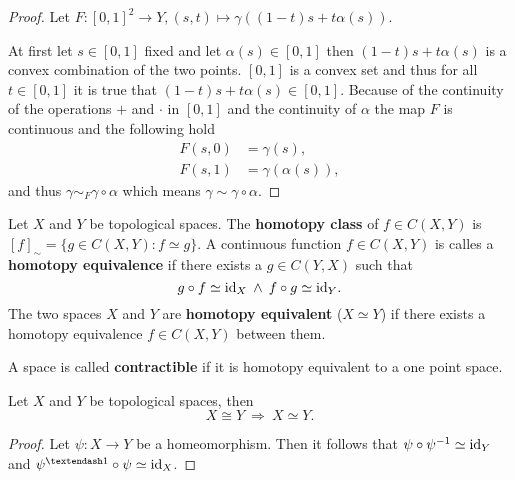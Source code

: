 \begin{proof}
  Let $F\colon [0,1]^2 \to Y, (s, t) \mapsto \gamma((1 - t)s + t\alpha(s))$.

  At first let $s \in [0,1]$ fixed and let $\alpha(s) \in [0,1]$ then $(1 - t)s + t\alpha(s)$ is a convex combination of the two points. 
  $[0,1]$ is a convex set and thus for all $t\in[0,1]$ it is true that $(1 - t)s + t\alpha(s) \in [0,1]$. Because of the continuity of the operations $+$ and $\cdot$ in $[0,1]$ 
  and the continuity of $\alpha$ the map $F$ is continuous and the following hold
  \begin{align*}
    F(s, 0) &= \gamma(s), \\
    F(s, 1) &= \gamma(\alpha(s)),
  \end{align*}
  and thus $\gamma \sim_F \gamma \circ \alpha$ which means $\gamma \sim \gamma \circ \alpha$.
\end{proof}

\begin{defin}
  Let $X$ and $Y$ be topological spaces. The \textbf{homotopy class} of $f \in C(X, Y)$ is $[f]_{\sim} = \{g \in C(X, Y)\colon f \simeq g\}$. A continuous function $f \in C(X, Y)$ is calles a \textbf{homotopy equivalence} if there exists a $g \in C(Y, X)$ such that
  \begin{equation*}
    g \circ f \simeq {\rm id}_X \: \land \: f \circ g \simeq {\rm id}_Y.
  \end{equation*}
  The two spaces $X$ and $Y$ are \textbf{homotopy equivalent} ($X \simeq Y$) if there exists a homotopy equivalence $f \in C(X, Y)$ between them.

  A space is called \textbf{contractible} if it is homotopy equivalent to a one point space.
\end{defin}

\begin{lemma}
  Let $X$ and $Y$ be topological spaces, then
  \begin{equation*}
    X \cong Y \: \Rightarrow \: X \simeq Y.
  \end{equation*}
\end{lemma}

\begin{proof}
  Let $\psi\colon X \to Y$ be a homeomorphism. Then it follows that $\psi \circ \psi^{-1} \simeq {\rm id}_Y$ and $\psi^{–1} \circ \psi \simeq \id_X$.  
\end{proof}

